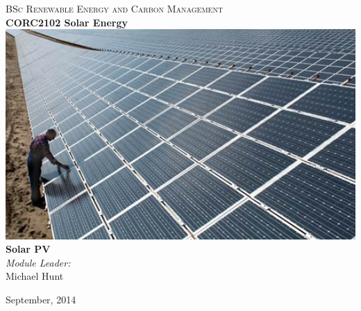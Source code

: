 \documentclass[class=scrartcl, crop=false,parskip=half]{standalone}
\begin{document}
\begin{titlepage}
\vbox{ }

\vbox{ }

\begin{center}
\textsc{\Large BSc Renewable Energy and Carbon Management}\\[0.5cm]
\vbox{ }
{ \huge \bfseries CORC2102 Solar Energy}\\[1.0cm]
\includegraphics[width=1.0\textwidth]{../figures/hugesolarplant.jpg}\\[1cm]

{ \huge \bfseries Solar PV}\\[1.0cm]


\emph{Module Leader:}\\
Michael Hunt

\vfill
{\large September, 2014}
\end{center}
\end{titlepage}
\end{document}
